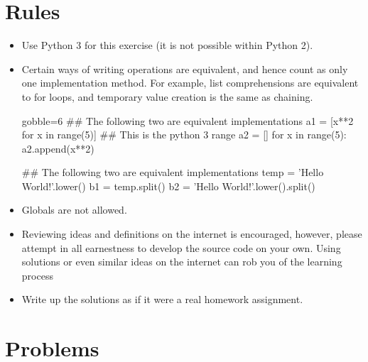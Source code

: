 \documentclass[10pt, letterpaper, acro-macros]{python-problem}
\date{}
\begin{document}
\maketitle

\section*{Rules}

\begin{itemize}
  \item Use Python 3 for this exercise (it is not possible within Python 2).

  \item
    Certain ways of writing operations are equivalent, and hence count as only
    one implementation method. For example, list comprehensions are equivalent
    to for loops, and temporary value creation is the same as chaining.

    \begin{pycode*}{gobble=6}
      ## The following two are equivalent implementations
      a1 = [x**2 for x in range(5)] ## This is the python 3 range
      a2 = []
      for x in range(5):
          a2.append(x**2)

      ## The following two are equivalent implementations
      temp = 'Hello World!'.lower()
      b1 = temp.split()
      b2 = 'Hello World!'.lower().split()
    \end{pycode*}

  \item Globals are not allowed.

  \item Reviewing ideas and definitions on the internet is encouraged,
        however, please attempt in all earnestness to develop the source
        code on your own. Using solutions or even similar ideas on the
        internet can rob you of the learning process

  \item Write up the solutions as if it were a real homework assignment.

\end{itemize}



\section*{Problems}
\end{document}
